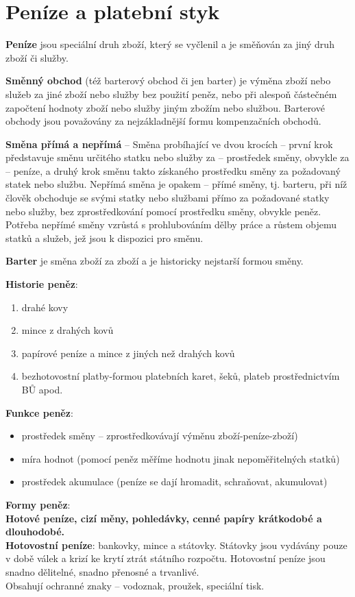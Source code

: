 \chapter{Peníze a platební styk}

\textbf{Peníze} jsou speciální druh zboží, který se vyčlenil a je směňován za jiný druh zboží či služby.

\textbf{Směnný obchod} (též barterový obchod či jen barter) je výměna zboží nebo služeb za jiné zboží nebo služby bez použití peněz, nebo při alespoň částečném započtení hodnoty zboží nebo služby jiným zbožím nebo službou. Barterové obchody jsou považovány za nejzákladnější formu kompenzačních obchodů.

\textbf{Směna přímá a nepřímá} -- Směna probíhající ve dvou krocích -- první krok představuje směnu určitého
statku nebo služby za -- prostředek směny, obvykle za -- peníze, a druhý krok směnu takto získaného
prostředku směny za požadovaný statek nebo službu. Nepřímá směna je opakem -- přímé směny, tj.
barteru, při níž člověk obchoduje se svými statky nebo službami přímo za požadované statky nebo
služby, bez zprostředkování pomocí prostředku směny, obvykle peněz. Potřeba nepřímé směny vzrůstá
s prohlubováním dělby práce a růstem objemu statků a služeb, jež jsou k dispozici pro směnu.

\textbf{Barter} je směna zboží za zboží a je historicky nejstarší formou směny.

\textbf{Historie peněz}:
\begin{enumerate}
    \item drahé kovy
    \item mince z drahých kovů
    \item papírové peníze a mince z jiných než drahých kovů
    \item bezhotovostní platby-formou platebních karet, šeků, plateb prostřednictvím BŮ apod.
\end{enumerate}

\textbf{Funkce peněz}:
\begin{itemize}
    \item prostředek směny -- zprostředkovávají výměnu zboží-peníze-zboží)
    \item míra hodnot (pomocí peněz měříme hodnotu jinak nepoměřitelných statků)
    \item prostředek akumulace (peníze se dají hromadit, schraňovat, akumulovat)
\end{itemize}

\textbf{Formy peněz}: \\
\textbf{Hotové peníze, cizí měny, pohledávky, cenné papíry krátkodobé a dlouhodobé.} \\
\textbf{Hotovostní peníze}: bankovky, mince a státovky. Státovky jsou vydávány pouze v době válek a krizí ke krytí ztrát státního rozpočtu. Hotovostní peníze jsou snadno dělitelné, snadno přenosné a trvanlivé. \\
Obsahují ochranné znaky -- vodoznak, proužek, speciální tisk.

